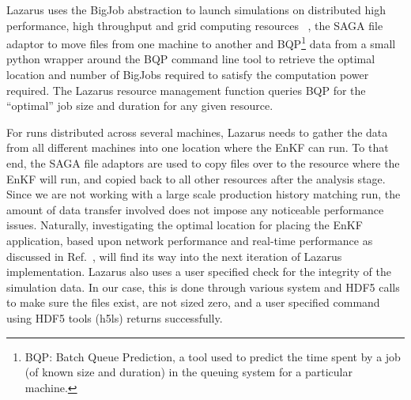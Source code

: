 \documentclass{acm_proc_article-sp}
\newcommand{\up}{\vspace*{-0.3em}}
\begin{document}


Lazarus uses the BigJob abstraction to launch simulations on
distributed high performance, high throughput and grid computing
resources ~\cite{gmac}, the SAGA file adaptor to move files from one
machine to another and BQP\footnote{BQP: Batch Queue Prediction, a tool
used to predict the time spent by a job (of known size and duration)
in the queuing system for a particular machine.} data from a small python wrapper around the
BQP command line tool to retrieve the optimal location and number of
BigJobs required to satisfy the computation power required. The Lazarus
resource management function queries BQP for the ``optimal'' job size
and duration for any given resource.

For runs distributed across several machines, Lazarus needs to gather
the data from all different machines into one location where the EnKF
can run. To that end, the SAGA file adaptors are used to copy files
over to the resource where the EnKF will run, and copied back to all
other resources after the analysis stage. Since we are not working
with a large scale production history matching run, the amount of data
transfer involved does not impose any noticeable performance
issues. Naturally, investigating the optimal location for placing the
EnKF application, based upon network performance and real-time
performance as discussed in Ref.~\cite{escience07}, will find its way
into the next iteration of Lazarus implementation.  Lazarus also uses
a user specified check for the integrity of the simulation data. In
our case, this is done through various system and HDF5 calls to make
sure the files exist, are not sized zero, and a user specified command
using HDF5 tools (h5ls) returns successfully.
\end{document}
